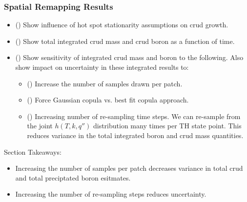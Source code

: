 \subsubsection{Spatial Remapping Results}
\begin{itemize}
	\item (\checkmark) Show influence of hot spot stationarity assumptions on crud growth.
\end{itemize}

\begin{itemize}
	\item (\checkmark) Show total integrated crud mass and crud boron as a function of time.
	\item (\checkmark) Show sensitivity of integrated crud mass and boron to the following.  Also show impact on uncertainty in these integrated results to:
	\begin{itemize}
		\item (\checkmark) Increase the number of samples drawn per patch.
		\item (\checkmark) Force Gaussian copula vs. best fit copula approach.
		\item (\checkmark) Increasing number of re-sampling time steps.
		We can re-sample from the joint $h(T, k, q'')$ distribution many times per TH state point.
		This reduces variance in the total integrated boron and crud mass quantities.
	\end{itemize}
\end{itemize}

Section Takeaways:
\begin{itemize}
	\item Increasing the number of samples per patch decreases variance in total crud and total preciptated boron esitmates.
	\item Increasing the number of re-sampling steps reduces uncertainty.
\end{itemize}
